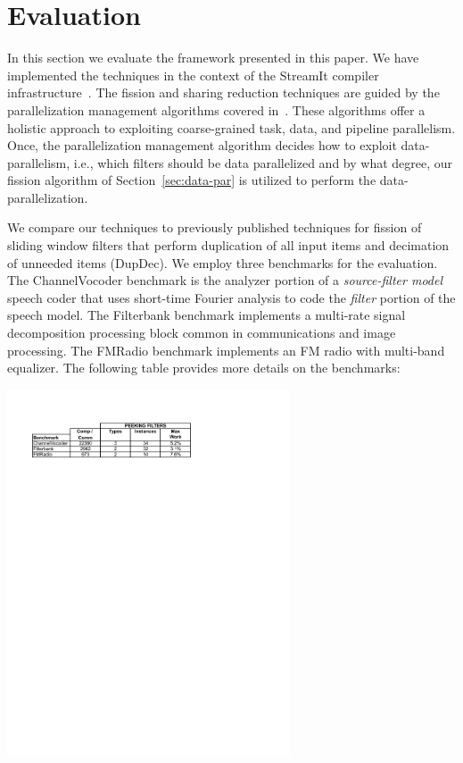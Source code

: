 \section{Evaluation}
\label{sec:eval}

In this section we evaluate the framework presented in this paper.  We
have implemented the techniques in the context of the StreamIt
compiler infrastructure~\cite{gordon-asplos06}.  The fission and
sharing reduction techniques are guided by the parallelization
management algorithms covered in~\cite{gordon-asplos06}.  These
algorithms offer a holistic approach to exploiting coarse-grained
task, data, and pipeline parallelism.   Once, the parallelization management
algorithm decides how to exploit data-parallelism, i.e., which
filters should be data parallelized and by what degree, our fission
algorithm of Section~\ref{sec:data-par} is utilized to perform the
data-parallelization. 

We compare our techniques to previously published techniques for
fission of sliding window filters that perform duplication of all
input items and decimation of unneeded items (DupDec).  We employ
three benchmarks for the evaluation.  The ChannelVocoder benchmark is
the analyzer portion of a {\it source-filter model} speech coder that
uses short-time Fourier analysis to code the {\it filter} portion of
the speech model.  The Filterbank benchmark implements a multi-rate
signal decomposition processing block common in communications and
image processing.  The FMRadio benchmark implements an FM radio with
multi-band equalizer.  The following table provides more details on
the benchmarks:


{\centering
\includegraphics[width=3.3in]{figures/bench-char.pdf}}

